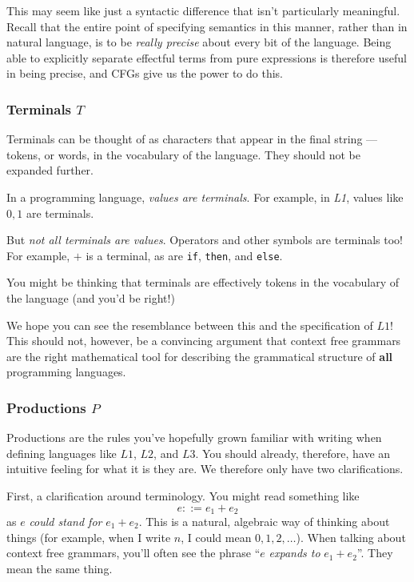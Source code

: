 This may seem like just a syntactic difference that isn't particularly meaningful. Recall that the entire point of specifying semantics in this manner, rather than in natural language, is to be \textit{really precise} about every bit of the language. Being able to explicitly separate effectful terms from pure expressions is therefore useful in being precise, and CFGs give us the power to do this.

\subsubsection{Terminals $T$}
Terminals can be thought of as characters that appear in the final string --- tokens, or words, in the vocabulary of the language. They should not be expanded further.

In a programming language, \textit{values are terminals}. For example, in \textit{L1}, values like $0, 1$ are terminals. 

But \textit{not all terminals are values}. Operators and other symbols are terminals too! For example, $+$ is a terminal, as are \texttt{if}, \texttt{then}, and \texttt{else}.

You might be thinking that terminals are effectively tokens in the vocabulary of the language (and you'd be right!)

We hope you can see the resemblance between this and the specification of $L1$! This should not, however, be a convincing argument that context free grammars are the right mathematical tool for describing the grammatical structure of \textbf{all} programming languages. 

\subsubsection{Productions $P$}
Productions are the rules you've hopefully grown familiar with writing when defining languages like $L1$, $L2$, and $L3$. You should already, therefore, have an intuitive feeling for what it is they are. We therefore only have two clarifications.

First, a clarification around terminology. You might read something like
\[ e ::= e_1 + e_2 \] 
as $e$ \textit{could stand for} $e_1 + e_2$. This is a natural, algebraic way of thinking about things (for example, when I write $n$, I could mean $0, 1, 2, \ldots$). When talking about context free grammars, you'll often see the phrase ``$e$ \textit{expands to} $e_1 + e_2$''. They mean the same thing.

